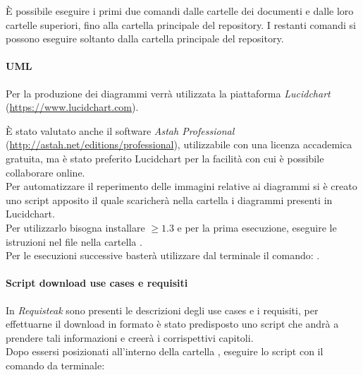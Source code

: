 È possibile eseguire i primi due comandi dalle cartelle dei documenti e dalle loro cartelle superiori, fino alla cartella principale del repository. I restanti comandi si possono eseguire soltanto dalla cartella principale del repository.

\paragraph{UML}
		
	Per la produzione dei diagrammi \emph{} verrà utilizzata la piattaforma \emph{Lucidchart}
	(\url{https://www.lucidchart.com}).
		
	È stato valutato anche il software \emph{Astah Professional} (\url{http://astah.net/editions/professional}), utilizzabile con
	una licenza accademica gratuita, ma è stato preferito Lucidchart per la facilità con cui è possibile collaborare online.\\
		
	Per automatizzare il reperimento delle immagini relative ai diagrammi  si è creato uno script apposito il quale
	scaricherà nella cartella  i diagrammi presenti in Lucidchart. \\
	Per utilizzarlo bisogna installare  $\geq 1.3$ e per la prima esecuzione, eseguire le istruzioni nel file
	 nella cartella . \\ 
	Per le esecuzioni successive basterà utilizzare dal terminale il comando: .
	
\paragraph{Script download use cases e requisiti}
	In \emph{Requisteak} sono presenti le descrizioni degli use cases e i requisiti, per effettuarne il download in formato
	 è stato predisposto uno script che andrà a prendere tali informazioni e creerà i corrispettivi capitoli.\\
	 Dopo essersi posizionati all'interno della cartella , eseguire lo script con il comando da terminale:
	  \\
	

